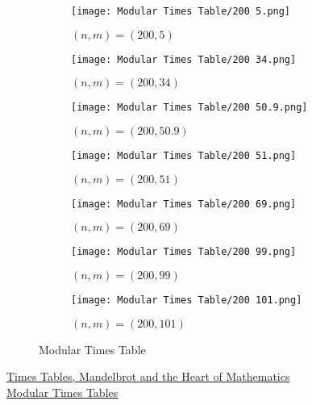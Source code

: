 \begin{figure}[H]
	\begin{subfigure}{0.145\linewidth}
		\texttt{[image: Modular Times Table/200 5.png]}
		\caption{$(n,m) = (200,5)$}
	\end{subfigure}
	\begin{subfigure}{0.145\linewidth}
		\texttt{[image: Modular Times Table/200 34.png]}
		\caption{$(n,m) = (200,34)$}
	\end{subfigure}
	\begin{subfigure}{0.145\linewidth}
		\texttt{[image: Modular Times Table/200 50.9.png]}
		\caption{$(n,m) = (200,50.9)$}
	\end{subfigure}
	\begin{subfigure}{0.145\linewidth}
		\texttt{[image: Modular Times Table/200 51.png]}
		\caption{$(n,m) = (200,51)$}
	\end{subfigure}
	\begin{subfigure}{0.145\linewidth}
		\texttt{[image: Modular Times Table/200 69.png]}
		\caption{$(n,m) = (200,69)$}
	\end{subfigure}
	\begin{subfigure}{0.145\linewidth}
		\texttt{[image: Modular Times Table/200 99.png]}
		\caption{$(n,m) = (200,99)$}
	\end{subfigure}
	\begin{subfigure}{0.145\linewidth}
		\texttt{[image: Modular Times Table/200 101.png]}
		\caption{$(n,m) = (200,101)$}
	\end{subfigure}
	\caption{Modular Times Table}
	\label{fig:timestabletestcases}
\end{figure}
\begin{funvideo}
	\href{https://youtu.be/qhbuKbxJsk8}{Times Tables, Mandelbrot and the Heart of Mathematics}\\
	\href{https://www.geogebra.org/m/z8wrdret}{Modular Times Tables}
\end{funvideo}
\recalctypearea